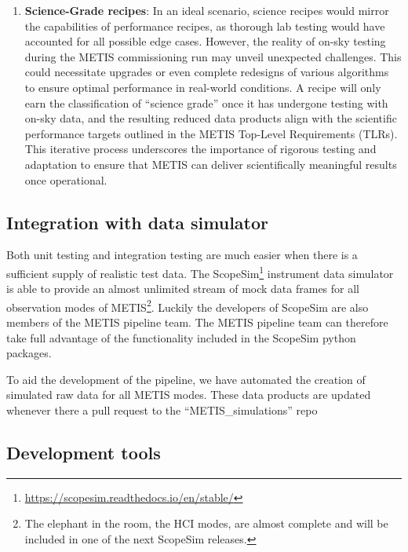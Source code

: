 \documentclass[a4paper]{spie}  %
\begin{document}
\begin{enumerate}
     \item \textbf{Science-Grade recipes}: In an ideal scenario, science recipes would mirror the capabilities of performance recipes, as thorough lab testing would have accounted for all possible edge cases. However, the reality of on-sky testing during the METIS commissioning run may unveil unexpected challenges. This could necessitate upgrades or even complete redesigns of various algorithms to ensure optimal performance in real-world conditions. A recipe will only earn the classification of ``science grade'' once it has undergone testing with on-sky data, and the resulting reduced data products align with the scientific performance targets outlined in the METIS Top-Level Requirements (TLRs). This iterative process underscores the importance of rigorous testing and adaptation to ensure that METIS can deliver scientifically meaningful results once operational. 
 \end{enumerate}


\subsection{Integration with data simulator}
\label{subsec:imp_sim}

Both unit testing and integration testing are much easier when there is a sufficient supply of realistic test data.
The ScopeSim\footnote{\url{https://scopesim.readthedocs.io/en/stable/}} instrument data simulator\cite{scopesim} is able to provide an almost unlimited stream of mock data frames for all observation modes of METIS\footnote{The elephant in the room, the HCI modes, are almost complete and will be included in one of the next ScopeSim releases.}.
Luckily the developers of ScopeSim are also members of the METIS pipeline team.
The METIS pipeline team can therefore take full advantage of the functionality included in the ScopeSim python packages.

To aid the development of the pipeline, we have automated the creation of simulated raw data for all METIS modes.
These data products are updated whenever there a pull request to the ``METIS_simulations'' repo




\subsection{Development tools}
\label{subsec:imp_tools}
\end{document}
